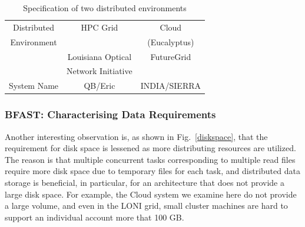 \documentclass{acm_proc_article-sp}
\begin{document}


 \begin{table}
 \begin{tabular}{|c|cc|} 
 \hline 
Distributed &  HPC Grid &  Cloud \\ 
Environment && (Eucalyptus)\\
\hline
 &  Louisiana Optical & FutureGrid \\
& Network Initiative  & \\
System  Name &  QB/Eric   &  INDIA/SIERRA \\
 \hline
 \end{tabular}
\caption{Specification of two distributed environments}
\label{table:two-systems} 
\end{table}
 
\subsubsection{BFAST: Characterising Data Requirements}


Another interesting observation is, as shown in Fig.~\ref{diskspace},
that the requirement for disk space is lessened as more distributing
resources are utilized. The reason is that multiple concurrent tasks
corresponding to multiple read files require more disk space due to
temporary files for each task, and distributed data storage is
beneficial, in particular, for an architecture that does not provide a
large disk space.  For example, the Cloud system we examine here do
not provide a large volume, and even in the LONI grid, small cluster
machines are hard to support an individual account more that 100 GB.
\end{document}
